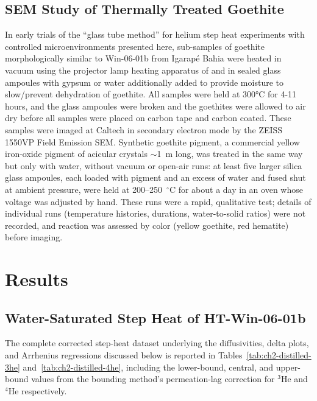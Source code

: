 \subsection{SEM Study of Thermally Treated Goethite}\label{sem-study-of-thermally-treated-polycrystalline-goethite}\label{sec:gt_pigment_methods}

In early trials of the ``glass tube method'' for helium step heat
experiments with controlled microenvironments presented here,
sub-samples of goethite morphologically similar to Win-06-01b from
Igarapé Bahia \citep{shustervasconcelos2005,monteiro2017} were heated in
vacuum using the projector lamp heating apparatus of \citet{farley1999}
and in sealed glass ampoules with gypsum or water additionally added to
provide moisture to slow/prevent dehydration of goethite. All samples
were held at 300°C for 4-11 hours, and the glass ampoules were broken
and the goethites were allowed to air dry before all samples were placed
on carbon tape and carbon coated. These samples were imaged at Caltech
in secondary electron mode by the ZEISS 1550VP Field Emission SEM.
Synthetic goethite pigment, a commercial yellow iron-oxide pigment of acicular crystals
$\sim$1~\textmu m long, was treated in the same way but only with water, without vacuum or
open-air runs: at least five larger silica glass ampoules, each loaded with pigment and an excess
of water and fused shut at ambient pressure, were held at 200--250~$^\circ$C for about a day in an
oven whose voltage was adjusted by hand. These runs were a rapid, qualitative test; details of
individual runs (temperature histories, durations, water-to-solid ratios) were not recorded, and
reaction was assessed by color (yellow goethite, red hematite) before imaging.

\section{\texorpdfstring{Results }{Results }}\label{ch2-results}

\subsection{Water-Saturated Step Heat of HT-Win-06-01b}\label{sec:gt_ht_results}

The complete corrected step-heat dataset underlying the diffusivities, delta plots, and Arrhenius regressions discussed below is reported in Tables~\ref{tab:ch2-distilled-3he} and~\ref{tab:ch2-distilled-4he}, including the lower-bound, central, and upper-bound values from the bounding method's permeation-lag correction for $^3$He and $^4$He respectively.


